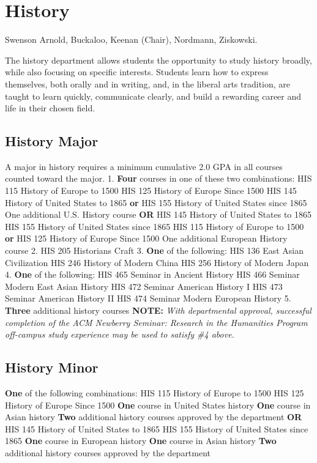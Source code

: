 \documentclass[
  letterpaper,
]{scrbook}
\begin{document}
\section{History}\label{sec-history}

Swenson Arnold, Buckaloo, Keenan (Chair), Nordmann, Ziskowski.

The history department allows students the opportunity to study history
broadly, while also focusing on specific interests. Students learn how
to express themselves, both orally and in writing, and, in the liberal
arts tradition, are taught to learn quickly, communicate clearly, and
build a rewarding career and life in their chosen field.

\subsection{History Major}\label{history-major}

A major in history requires a minimum cumulative 2.0 GPA in all courses
counted toward the major. 1. \textbf{Four} courses in one of these two
combinations: HIS 115 History of Europe to 1500 HIS 125 History of
Europe Since 1500 HIS 145 History of United States to 1865 \textbf{or}
HIS 155 History of United States since 1865 One additional U.S. History
course \textbf{OR} HIS 145 History of United States to 1865 HIS 155
History of United States since 1865 HIS 115 History of Europe to 1500
\textbf{or} HIS 125 History of Europe Since 1500 One additional European
History course 2. HIS 205 Historians Craft 3. \textbf{One} of the
following: HIS 136 East Asian Civilization HIS 246 History of Modern
China HIS 256 History of Modern Japan 4. \textbf{One} of the following:
HIS 465 Seminar in Ancient History HIS 466 Seminar Modern East Asian
History HIS 472 Seminar American History I HIS 473 Seminar American
History II HIS 474 Seminar Modern European History 5. \textbf{Three}
additional history courses \textbf{NOTE:} \emph{With departmental
approval, successful completion of the ACM Newberry Seminar: Research in
the Humanities Program off-campus study experience may be used to
satisfy \#4 above.}

\subsection{History Minor}\label{history-minor}

\textbf{One} of the following combinations: HIS 115 History of Europe to
1500 HIS 125 History of Europe Since 1500 \textbf{One} course in United
States history \textbf{One} course in Asian history \textbf{Two}
additional history courses approved by the department \textbf{OR} HIS
145 History of United States to 1865 HIS 155 History of United States
since 1865 \textbf{One} course in European history \textbf{One} course
in Asian history \textbf{Two} additional history courses approved by the
department
\end{document}
